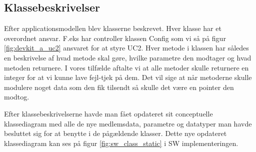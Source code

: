 \subsection{Klassebeskrivelser}

Efter applicationsmodellen blev klasserne beskrevet. Hver klasse har et overordnet ansvar. F.eks har controller klassen Config som vi så på figur \ref{fig:devkit_a_uc2} ansvaret for at styre UC2. Hver metode i klassen har således en beskrivelse af hvad metode skal gøre, hvilke parametre den modtager og hvad metoden returnere. I vores tilfælde aftalte vi at alle metoder skulle returnere en integer for at vi kunne lave fejl-tjek på dem. Det vil sige at når metoderne skulle modulere noget data som den fik tilsendt så skulle det være en pointer den modtog.

Efter klassebeskrivelserne havde man fået opdateret sit conceptuelle klassediagram med alle de nye medlemsdata, parametre og datatyper man havde besluttet sig for at benytte i de pågældende klasser. Dette nye opdateret klassediagram kan ses på figur \ref{fig:sw_class_static} i SW implementeringen. 




